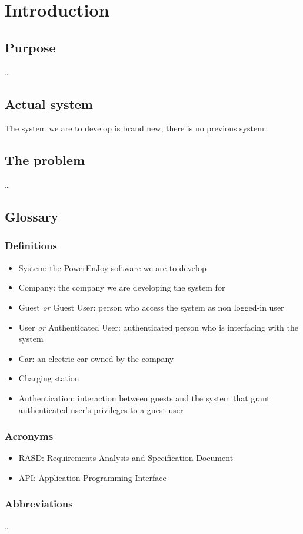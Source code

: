 \documentclass[a4paper,10pt]{article}
\begin{document}
\section{Introduction}
	\subsection{Purpose}
	 \ldots
	\subsection{Actual system}
	The system we are to develop is brand new, there is no previous system.
	\subsection{The problem}
	 \ldots
	\subsection{Glossary}
		\subsubsection{Definitions}
		\begin{itemize}
			\item System: the PowerEnJoy software we are to develop
			\item Company: the company we are developing the system for
			\item Guest \emph{or} Guest User: person who access the system as non logged-in user
			\item User \emph{or} Authenticated User: authenticated person who is interfacing with the system
			\item Car: an electric car owned by the company
			\item Charging station
			\item Authentication: interaction between guests and the system that grant authenticated user's privileges to a guest user
		\end{itemize}
	\subsubsection{Acronyms}
		\begin{itemize}
			\item RASD: Requirements Analysis and Specification Document
			\item API: Application Programming Interface
		\end{itemize}
	\subsubsection{Abbreviations}
	 \ldots
\end{document}
